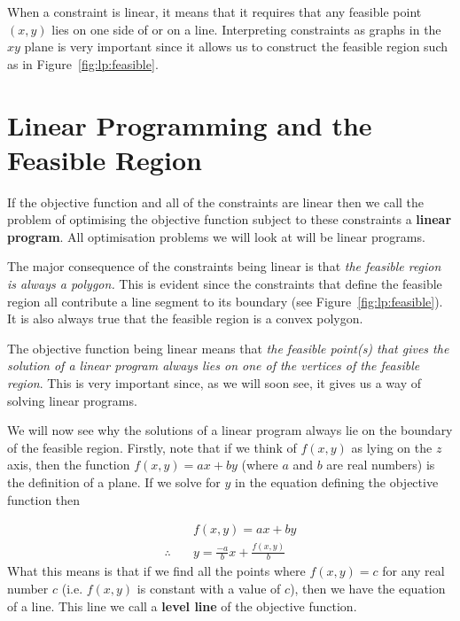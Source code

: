 When a constraint is linear, it means that it requires that any feasible point $(x,y)$ lies on one side of or on a line. Interpreting constraints as graphs in the $xy$ plane is very important since it allows us to construct the feasible region such as in Figure~\ref{fig:lp:feasible}. 

\section{Linear Programming and the Feasible Region}
If the objective function and all of the constraints are linear then we call the problem of optimising the objective function subject to these constraints a \textbf{linear program}. All optimisation problems we will look at will be linear programs.

The major consequence of the constraints being linear is that \textit{the feasible region is always a polygon.} This is evident since the constraints that define the feasible region all contribute a line segment to its boundary (see Figure~\ref{fig:lp:feasible}). It is also always true that the feasible region is a convex polygon.

The objective function being linear means that \textit{the feasible point(s) that gives the solution of a linear program always lies on one of the vertices of the feasible region}. This is very important since, as we will soon see, it gives us a way of solving linear programs. 

We will now see why the solutions of a linear program always lie on the boundary of the feasible region. Firstly, note that if we think of $f(x,y)$ as lying on the $z$ axis, then the function $f(x,y)=ax+by$ (where $a$ and $b$ are real numbers) is the definition of a plane. If we solve for $y$ in the equation defining the objective function then

\begin{align}
\nonumber & \quad f(x,y)=ax+by\\
\therefore & \quad y=\frac{-a}{b}x+\frac{f(x,y)}{b}
\end{align}
\label{eq:num:levelline}
What this means is that if we find all the points where $f(x,y)=c$ for any real number $c$ (i.e. $f(x,y)$ is constant with a value of $c$), then we have the equation of a line. This line we call a \textbf{level line} of the objective function.

